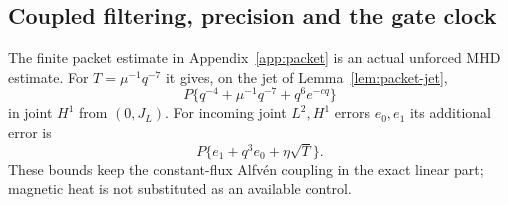 \documentclass[11pt,a4paper]{amsart}
\theoremstyle{definition}
\theoremstyle{remark}
\numberwithin{equation}{section}
\begin{document}
\subsection{Coupled filtering, precision and the gate clock}

The finite packet estimate in Appendix~\ref{app:packet} is an actual unforced
MHD estimate.  For $T=\mu^{-1}q^{-7}$ it gives, on the jet of
Lemma~\ref{lem:packet-jet},
\begin{equation}\label{eq:gate-packet-error}
 P\{q^{-4}+\mu^{-1}q^{-7}+q^6e^{-cq}\}
\end{equation}
in joint $H^1$ from $(0,J_L)$.  For incoming joint $L^2,H^1$ errors
$e_0,e_1$ its additional error is
\begin{equation}\label{eq:gate-packet-rough}
 P\{e_1+q^3e_0+\eta\sqrt T\}.
\end{equation}
These bounds keep the constant-flux Alfv\'en coupling in the exact linear
part; magnetic heat is not substituted as an available control.
\end{document}
